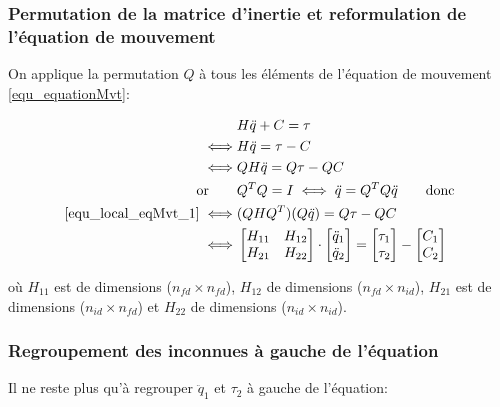 \documentclass{report}
\begin{document}

\subsubsection{Permutation de la matrice d'inertie et reformulation de l'équation de mouvement}

On applique la permutation $Q$ à tous les éléments de l'équation de mouvement \eqref{equ_equationMvt}:
\begin{spacing}{1.5}
\begin{align}
&H \ddot{q} + C = \tau \notag \\
\iff &H \ddot{q} = \tau - C \notag \\
\iff &Q H \ddot{q} = Q \tau - Q C \label{equ_local_eqMvt_1} \\
\textnormal{or} \qquad &Q^T Q = I \iff \ddot{q} = Q^T Q \ddot{q} \qquad \textnormal{donc} \notag \\
\eqref{equ_local_eqMvt_1} \iff &(Q H Q^T) (Q \ddot{q}) = Q \tau - Q C \notag \\
\iff 
&\begin{bmatrix}
  H_{11} & H_{12} \\
  H_{21} & H_{22}
\end{bmatrix} 
\cdot
\begin{bmatrix}
  \ddot{q}_{1} \\
  \ddot{q}_{2}
\end{bmatrix} 
= 
\begin{bmatrix}
  \tau_{1} \\
  \tau_{2}
\end{bmatrix} 
-
\begin{bmatrix}
  C_{1} \\
  C_{2}
\end{bmatrix} \label{equ_local_eqMvt_2}
\end{align}
\end{spacing}

où $H_{11}$ est de dimensions ($n_{fd} \times n_{fd}$), $H_{12}$ de dimensions ($n_{fd} \times n_{id}$), $H_{21}$ est de dimensions ($n_{id} \times n_{fd}$) et $H_{22}$ de dimensions ($n_{id} \times n_{id}$).
\subsubsection{Regroupement des inconnues à gauche de l'équation}

Il ne reste plus qu'à regrouper $\ddot{q}_1$ et $\tau_2$ à gauche de l'équation:
\end{document}

